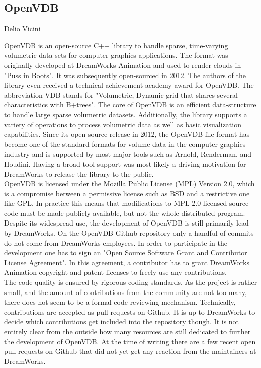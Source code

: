 \subsection{OpenVDB}{Delio Vicini}

OpenVDB is an open-source C++ library to handle sparse, time-varying volumetric data sets for computer graphics applications. The format was originally developed at DreamWorks Animation and used to render clouds in "Puss in Boots". It was subsequently open-sourced in 2012.\cite{Museth.2013} The authors of the library even received a technical achievement academy award for OpenVDB.\cite{openvdb-about} The abbreviation VDB stands for "Volumetric, Dynamic grid that shares several characteristics with B+trees".\cite{Museth.2013} The core of OpenVDB is an efficient data-structure to handle large sparse volumetric datasets. Additionally, the library supports a variety of operations to process volumetric data as well as basic visualization capabilities. Since its open-source release in 2012, the OpenVDB file format has become one of the standard formats for volume data in the computer graphics industry and is supported by most major tools such as Arnold, Renderman, and Houdini.\cite{openvdb-about} Having a broad tool support was most likely a driving motivation for DreamWorks to release the library to the public.\\

OpenVDB is licensed under the Mozilla Public License (MPL) Version 2.0, which is a compromise between a permissive license such as BSD and a restrictive one like GPL. In practice this means that modifications to MPL 2.0 licensed source code must be made publicly available, but not the whole distributed program.\cite{mpl-faq} \\

Despite its widespread use, the development of OpenVDB is still primarily lead by DreamWorks. On the OpenVDB Github repository only a handful of commits do not come from DreamWorks employees.\cite{openvdb-contribs} In order to participate in the development one has to sign an "Open Source Software Grant and Contributor License Agreement".\cite{openvdb-agree} In this agreement, a contributor has to grant DreamWorks Animation copyright and patent licenses to freely use any contributions. \\

The code quality is ensured by rigorous coding standards.\cite{openvdb-code} As the project is rather small, and the amount of contributions from the community are not too many, there does not seem to be a formal code reviewing mechanism. Technically, contributions are accepted as pull requests on Github. It is up to DreamWorks to decide which contributions get included into the repository though. It is not entirely clear from the outside how many resources are still dedicated to further the development of OpenVDB. At the time of writing there are a few recent open pull requests on Github that did not yet get any reaction from the maintainers at DreamWorks. \\


